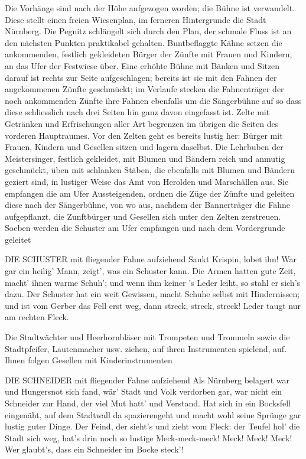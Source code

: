 \begin{drama}
Die Vorhänge sind nach der Höhe aufgezogen worden; die Bühne ist verwandelt. Diese stellt einen freien Wiesenplan, im ferneren Hintergrunde die Stadt Nürnberg. Die Pegnitz schlängelt sich durch den Plan, der schmale Fluss ist an den nächsten Punkten praktikabel gehalten. Buntbeflaggte Kähne setzen die ankommenden, festlich gekleideten Bürger der Zünfte mit Frauen und Kindern, an das Ufer der Festwiese über. Eine erhöhte Bühne mit Bänken und Sitzen darauf ist rechts zur Seite aufgeschlagen; bereits ist sie mit den Fahnen der angekommenen Zünfte geschmückt; im Verlaufe stecken die Fahnenträger der noch ankommenden Zünfte ihre Fahnen ebenfalls um die Sängerbühne auf so dass diese schliesslich nach drei Seiten hin ganz davon eingefasst ist. Zelte mit Getränken und Erfrischungen aller Art begrenzen im übrigen die Seiten des vorderen Hauptraumes. Vor den Zelten geht es bereits lustig her: Bürger mit Frauen, Kindern und Gesellen sitzen und lagern daselbst. Die Lehrbuben der Meistersinger, festlich gekleidet, mit Blumen und Bändern reich und anmutig geschmückt, üben mit schlanken Stäben, die ebenfalls mit Blumen und Bändern geziert sind, in lustiger Weise das Amt von Herolden und Marschällen aus. Sie empfangen die am Ufer Aussteigenden, ordnen die Züge der Zünfte und geleiten diese nach der Sängerbühne, von wo aus, nachdem der Bannerträger die Fahne aufgepflanzt, die Zunftbürger und Gesellen sich unter den Zelten zerstreuen. Soeben werden die Schuster am Ufer empfangen und nach dem Vordergrunde geleitet

DIE SCHUSTER
mit fliegender Fahne aufziehend
Sankt Krispin, lobet ihn!
War gar ein heilig' Mann,
zeigt', was ein Schuster kann.
Die Armen hatten gute Zeit,
macht' ihnen warme Schuh';
und wenn ihm keiner 's Leder leiht,
so stahl er sich's dazu.
Der Schuster hat ein weit Gewissen,
macht Schuhe selbst mit Hindernissen;
und ist vom Gerber das Fell erst weg,
dann streck, streck, streck!
Leder taugt nur am rechten Fleck.

Die Stadtwächter und Heerhornbläser mit Trompeten und Trommeln sowie die Stadtpfeifer, Lautenmacher usw. ziehen, auf ihren Instrumenten spielend, auf. Ihnen folgen Gesellen mit Kinderinstrumenten

DIE SCHNEIDER
mit fliegender Fahne aufziehend
Als Nürnberg belagert war
und Hungersnot sich fand,
wär' Stadt und Volk verdorben gar,
war nicht ein Schneider zur Hand,
der viel Mut hatt' und Verstand.
Hat sich in ein Bocksfell eingenäht,
auf dem Stadtwall da spazierengeht
und macht wohl seine Sprünge
gar lustig guter Dinge.
Der Feind, der sieht's und zieht vom Fleck:
der Teufel hol' die Stadt sich weg,
hat's drin noch so lustige Meck-meck-meck!
Meck! Meck! Meck!
Wer glaubt's, dass ein Schneider im Bocke steck'!


\end{drama}
